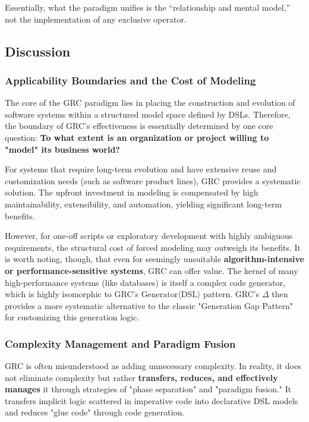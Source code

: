 \documentclass[11pt]{article}
\begin{document}
Essentially, what the paradigm unifies is the ``relationship and mental model,'' not the implementation of any exclusive operator.


\subsection{Discussion}

\subsubsection{Applicability Boundaries and the Cost of Modeling}

The core of the GRC paradigm lies in placing the construction and evolution of software systems within a structured model space defined by DSLs. Therefore, the boundary of GRC's effectiveness is essentially determined by one core question: \textbf{To what extent is an organization or project willing to "model" its business world?}

For systems that require long-term evolution and have extensive reuse and customization needs (such as software product lines), GRC provides a systematic solution. The upfront investment in modeling is compensated by high maintainability, extensibility, and automation, yielding significant long-term benefits.

However, for one-off scripts or exploratory development with highly ambiguous requirements, the structural cost of forced modeling may outweigh its benefits. It is worth noting, though, that even for seemingly unsuitable \textbf{algorithm-intensive or performance-sensitive systems}, GRC can offer value. The kernel of many high-performance systems (like databases) is itself a complex code generator, which is highly isomorphic to GRC's $\text{Generator}\langle\text{DSL}\rangle$ pattern. GRC's $\Delta$ then provides a more systematic alternative to the classic "Generation Gap Pattern" for customizing this generation logic.

\subsubsection{Complexity Management and Paradigm Fusion}

GRC is often misunderstood as adding unnecessary complexity. In reality, it does not eliminate complexity but rather \textbf{transfers, reduces, and effectively manages} it through strategies of "phase separation" and "paradigm fusion." It transfers implicit logic scattered in imperative code into declarative DSL models and reduces "glue code" through code generation.
\end{document}
